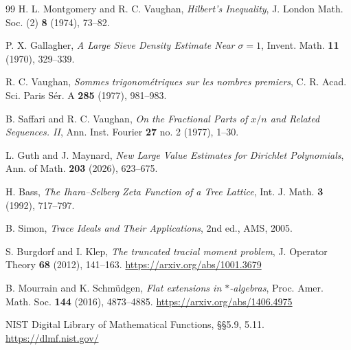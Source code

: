 \documentclass[UTF8,11pt,a4paper]{ctexart}
\theoremstyle{definition}
\theoremstyle{remark}
\newcommand{\1}{\mathbf 1}
\begin{document}
\begin{thebibliography}{99}
H. L. Montgomery and R. C. Vaughan, \emph{Hilbert's Inequality}, J. London Math. Soc. (2) \textbf{8} (1974), 73--82.

P. X. Gallagher, \emph{A Large Sieve Density Estimate Near $\sigma=1$}, Invent. Math. \textbf{11} (1970), 329--339.

R. C. Vaughan, \emph{Sommes trigonom\'etriques sur les nombres premiers}, C. R. Acad. Sci. Paris S\'er. A \textbf{285} (1977), 981--983.

B. Saffari and R. C. Vaughan, \emph{On the Fractional Parts of $x/n$ and Related Sequences. II}, Ann. Inst. Fourier \textbf{27} no. 2 (1977), 1--30.

L. Guth and J. Maynard, \emph{New Large Value Estimates for Dirichlet Polynomials}, Ann. of Math. \textbf{203} (2026), 623--675.

H. Bass, \emph{The Ihara--Selberg Zeta Function of a Tree Lattice}, Int. J. Math. \textbf{3} (1992), 717--797.

B. Simon, \emph{Trace Ideals and Their Applications}, 2nd ed., AMS, 2005.

S. Burgdorf and I. Klep,
\emph{The truncated tracial moment problem},
J. Operator Theory \textbf{68} (2012), 141--163.
\url{https://arxiv.org/abs/1001.3679}

B. Mourrain and K. Schm\"udgen,
\emph{Flat extensions in $*$-algebras},
Proc. Amer. Math. Soc. \textbf{144} (2016), 4873--4885.
\url{https://arxiv.org/abs/1406.4975}

NIST Digital Library of Mathematical Functions, §§5.9, 5.11.
\url{https://dlmf.nist.gov/}

\end{thebibliography}
\end{document}
